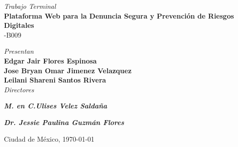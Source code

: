\begin{titlepage}
    {\fontsize{14}{16.8}\selectfont \textit{Trabajo Terminal}}\\[0.8cm]
    {\fontsize{16}{19.2}\selectfont \bfseries Plataforma Web para la Denuncia Segura y Prevención de Riesgos Digitales}\\[0.6cm]
    {\fontsize{14}{16.8}-B009}\\[1.5cm]

    \vfill

    {\large \textit{Presentan}}\\[0.4cm]
    {\large \textbf{Edgar Jair Flores Espinosa}}\\[1.5cm]
    {\large \textbf{Jose Bryan Omar Jimenez Velazquez}}\\[1.5cm]
    {\large \textbf{Leilani Shareni Santos Rivera}}\\[1.5cm]


    {\large \textit{Directores}}\\[0.8cm]
    \begin{minipage}{0.45\textwidth}
        \centering
        \textbf{\textit{M. en C.Ulises Velez Saldaña}}
    \end{minipage}
    \begin{minipage}{0.45\textwidth}
        \centering
        \textbf{\textit{Dr. Jessie Paulina Guzmán Flores}}
    \end{minipage}

    \vfill

    {\fontsize{12}{14.4}\selectfont Ciudad de México, \today}

    \restoregeometry
\end{titlepage}